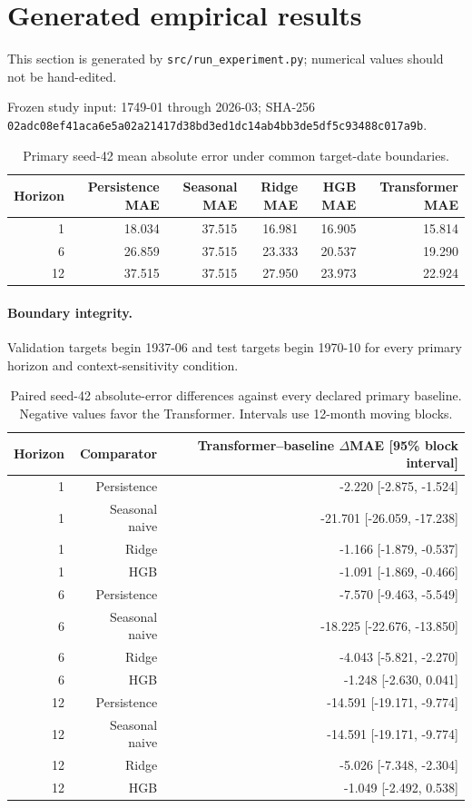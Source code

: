 \section{Generated empirical results}
This section is generated by \texttt{src/run\_experiment.py}; numerical values should not be hand-edited.

Frozen study input: 1749-01 through 2026-03; SHA-256 \texttt{02adc08ef41aca6e5a02a21417d38bd3ed1dc14ab4bb3de5df5c93488c017a9b}.

\begin{table}[htbp]
\centering
\small
\begin{tabular}{rrrrrr}
\toprule
Horizon & Persistence MAE & Seasonal MAE & Ridge MAE & HGB MAE & Transformer MAE \\
\midrule
1 & 18.034 & 37.515 & 16.981 & 16.905 & 15.814 \\
6 & 26.859 & 37.515 & 23.333 & 20.537 & 19.290 \\
12 & 37.515 & 37.515 & 27.950 & 23.973 & 22.924 \\
\bottomrule
\end{tabular}
\caption{Primary seed-42 mean absolute error under common target-date boundaries.}
\label{tab:primary-results}
\end{table}

\paragraph{Boundary integrity.}
Validation targets begin 1937-06 and test targets begin 1970-10 for every primary horizon and context-sensitivity condition.

\begin{table}[htbp]
\centering
\small
\begin{tabular}{rrr}
\toprule
Horizon & Comparator & Transformer--baseline $\Delta$MAE [95\% block interval] \\
\midrule
1 & Persistence & -2.220 [-2.875, -1.524] \\
1 & Seasonal naive & -21.701 [-26.059, -17.238] \\
1 & Ridge & -1.166 [-1.879, -0.537] \\
1 & HGB & -1.091 [-1.869, -0.466] \\
6 & Persistence & -7.570 [-9.463, -5.549] \\
6 & Seasonal naive & -18.225 [-22.676, -13.850] \\
6 & Ridge & -4.043 [-5.821, -2.270] \\
6 & HGB & -1.248 [-2.630, 0.041] \\
12 & Persistence & -14.591 [-19.171, -9.774] \\
12 & Seasonal naive & -14.591 [-19.171, -9.774] \\
12 & Ridge & -5.026 [-7.348, -2.304] \\
12 & HGB & -1.049 [-2.492, 0.538] \\
\bottomrule
\end{tabular}
\caption{Paired seed-42 absolute-error differences against every declared primary baseline. Negative values favor the Transformer. Intervals use 12-month moving blocks.}
\end{table}

